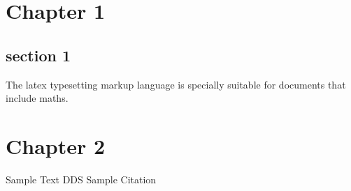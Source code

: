 	
	\chapter{Chapter 1}
	
	\section{section 1}
	
	The \Gls{latex} typesetting markup language is specially suitable 
	for documents that include \gls{maths}. 
	\chapter{Chapter 2}
	Sample Text \ac{DDS}
	Sample Citation \cite{park2011interface}